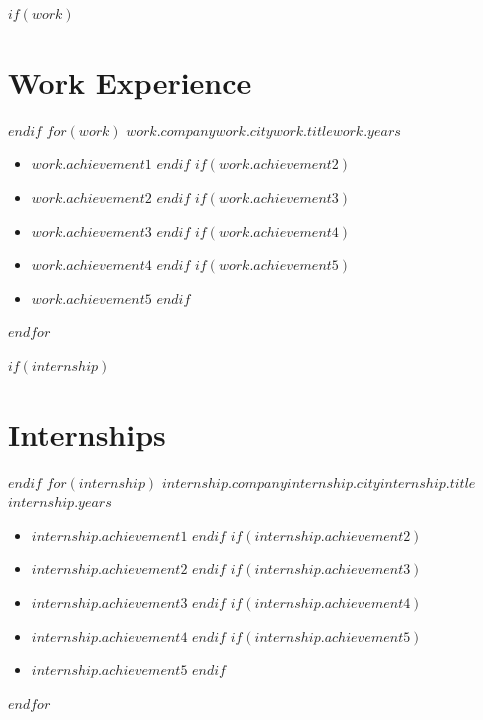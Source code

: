 \documentclass[11pt]{cv-class}
\begin{document}


$if(work)$ \section{Work Experience} $endif$
$for(work)$
    \noindent\textbf{$work.company$}\hfill{$work.city$}\break\textit{$work.title$}\hfill{$work.years$}
    \begin{itemize}[noitemsep,nolistsep,leftmargin=*]
        $if(work.achievement1)$ \item \raggedright{$work.achievement1$} $endif$
        $if(work.achievement2)$ \item \raggedright{$work.achievement2$} $endif$
        $if(work.achievement3)$ \item \raggedright{$work.achievement3$} $endif$
        $if(work.achievement4)$ \item \raggedright{$work.achievement4$} $endif$
        $if(work.achievement5)$ \item \raggedright{$work.achievement5$} $endif$
    \end{itemize}
    \bigskip
$endfor$

$if(internship)$ \section{Internships} $endif$
$for(internship)$
    \noindent\textbf{$internship.company$}\hfill{$internship.city$}\break\textit{$internship.title$}\hfill{$internship.years$}
    \begin{itemize}[noitemsep,nolistsep,leftmargin=*]
        $if(internship.achievement1)$ \item \raggedright{$internship.achievement1$} $endif$
        $if(internship.achievement2)$ \item \raggedright{$internship.achievement2$} $endif$
        $if(internship.achievement3)$ \item \raggedright{$internship.achievement3$} $endif$
        $if(internship.achievement4)$ \item \raggedright{$internship.achievement4$} $endif$
        $if(internship.achievement5)$ \item \raggedright{$internship.achievement5$} $endif$
    \end{itemize}
    \bigskip
$endfor$
\end{document}
